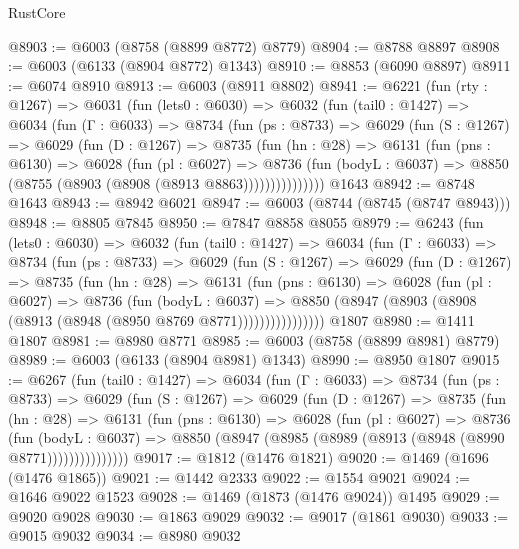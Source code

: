 \begin{lexlean}{RustCore}
\begin{coremodule}
{\begin{coremodule}
{{{{{{{{{{{{{{{{{{{{{{{{{{{{{{{{{{{{{{{{{{{{{{{@8903 := @6003 (@8758 (@8899 @8772) @8779)
@8904 := @8788 @8897
@8908 := @6003 (@6133 (@8904 @8772) @1343)
@8910 := @8853 (@6090 @8897)
@8911 := @6074 @8910
@8913 := @6003 (@8911 @8802)
@8941 := @6221
    (fun (rty : @1267) =>
    @6031
      (fun (lets0 : @6030) =>
      @6032
        (fun (tail0 : @1427) =>
        @6034
          (fun (Γ : @6033) =>
          @8734
            (fun (ps : @8733) =>
            @6029
              (fun (S : @1267) =>
              @6029
                (fun (D : @1267) =>
                @8735
                  (fun (hn : @28) =>
                  @6131
                    (fun (pns : @6130) =>
                    @6028
                      (fun (pl : @6027) =>
                      @8736
                        (fun (bodyL : @6037) =>
                        @8850 (@8755 (@8903 (@8908 (@8913 @8863)))))))))))))))
    @1643
@8942 := @8748 @1643
@8943 := @8942 @6021
@8947 := @6003 (@8744 (@8745 (@8747 @8943)))
@8948 := @8805 @7845
@8950 := @7847 @8858 @8055
@8979 := @6243
    (fun (lets0 : @6030) =>
    @6032
      (fun (tail0 : @1427) =>
      @6034
        (fun (Γ : @6033) =>
        @8734
          (fun (ps : @8733) =>
          @6029
            (fun (S : @1267) =>
            @6029
              (fun (D : @1267) =>
              @8735
                (fun (hn : @28) =>
                @6131
                  (fun (pns : @6130) =>
                  @6028
                    (fun (pl : @6027) =>
                    @8736
                      (fun (bodyL : @6037) =>
                      @8850 (@8947 (@8903 (@8908 (@8913 (@8948 (@8950 @8769 @8771))))))))))))))))
    @1807
@8980 := @1411 @1807
@8981 := @8980 @8771
@8985 := @6003 (@8758 (@8899 @8981) @8779)
@8989 := @6003 (@6133 (@8904 @8981) @1343)
@8990 := @8950 @1807
@9015 := @6267
    (fun (tail0 : @1427) =>
    @6034
      (fun (Γ : @6033) =>
      @8734
        (fun (ps : @8733) =>
        @6029
          (fun (S : @1267) =>
          @6029
            (fun (D : @1267) =>
            @8735
              (fun (hn : @28) =>
              @6131
                (fun (pns : @6130) =>
                @6028
                  (fun (pl : @6027) =>
                  @8736
                    (fun (bodyL : @6037) =>
                    @8850 (@8947 (@8985 (@8989 (@8913 (@8948 (@8990 @8771)))))))))))))))
@9017 := @1812 (@1476 @1821)
@9020 := @1469 (@1696 (@1476 @1865))
@9021 := @1442 @2333
@9022 := @1554 @9021
@9024 := @1646 @9022 @1523
@9028 := @1469 (@1873 (@1476 @9024)) @1495
@9029 := @9020 @9028
@9030 := @1863 @9029
@9032 := @9017 (@1861 @9030)
@9033 := @9015 @9032
@9034 := @8980 @9032
}}}}}}}}}}}}}}}}}}}}}}}}}}}}}}}}}}}}}}}}}}}}}}}
\end{coremodule}}
\end{coremodule}
\end{lexlean}
